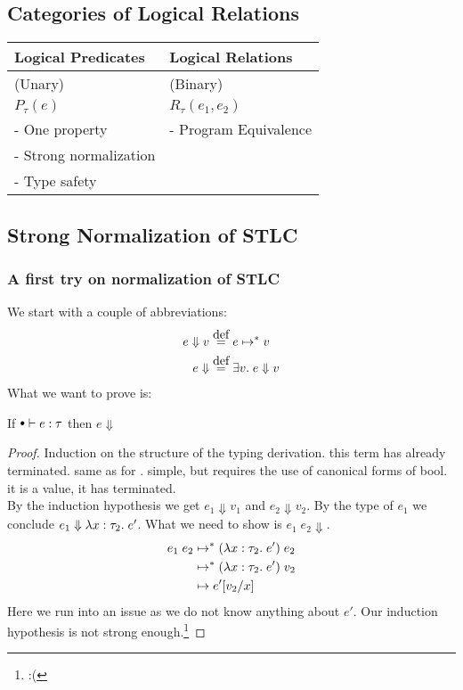 \subsection*{Categories of Logical Relations}
\begin{tabular}{l | l}
  Logical Predicates     & Logical Relations    \\
\hline
  (Unary)                & (Binary)             \\
  $P_\tau(e)$             & $R_\tau(e_1,e_2)$     \\
  - One property         & - Program Equivalence\\ %
  - Strong normalization & \\
  - Type safety          & \\
\end{tabular}
\subsection*{Strong Normalization of STLC}
\subsubsection*{A first try on normalization of STLC}
We start with a couple of abbreviations:
\begin{align*}
  e \Downarrow v & \eqdef e \evaltos v \\
  e \Downarrow   & \eqdef \exists v. \; e \Downarrow v
\end{align*}
What we want to prove is:
\begin{strnorm}
  If $\mtenv \vdash e : \tau$ then $e \Downarrow$
\end{strnorm}
\begin{proof} 
Induction on the structure of the typing derivation.
 this term has already terminated.
 same as for \true.
 simple, but requires the use of canonical forms of bool.
 it is a value, it has terminated.
\case{$ \TApp $} \\
By the induction hypothesis we get $e_1 \Downarrow v_1$ and $e_2 \Downarrow v_2$. By the type of $e_1$ we conclude $e_1 \Downarrow \lambda x : \tau_2 . \; e'$. What we need to show is $e_1 \; e_2 \Downarrow$.
\begin{align*}
  e_1 \; e_2 & \mapsto^{*} (\lambda x : \tau_2 . \; e') \; e_2 \\
            & \mapsto^{*} (\lambda x : \tau_2 . \; e') \; v_2 \\
            & \mapsto e'[v_2/x]
\end{align*}
Here we run into an issue as we do not know anything about $e'$. Our induction hypothesis is not strong enough.\footnote{:(}
\end{proof}
